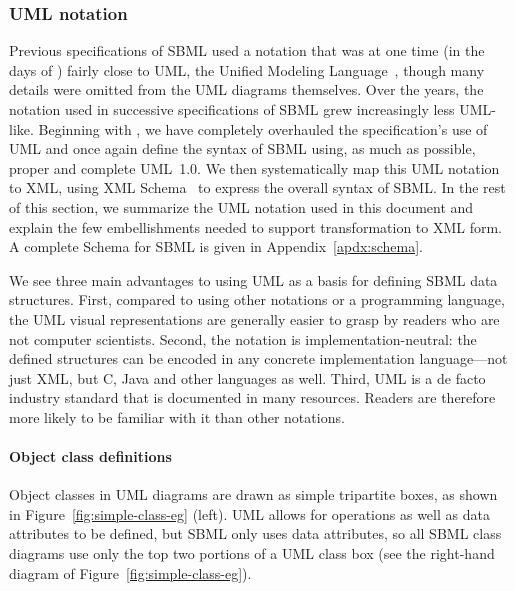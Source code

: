 \begin{blockChanged}

\subsubsection{UML notation}
\label{sec:notation-uml}


Previous specifications of SBML used a notation that was at one
time (in the days of \sbmlone) fairly close to UML, the Unified
Modeling Language~\citep{eriksson:1998,oestereich:1999}, though
many details were omitted from the UML diagrams themselves.  Over
the years, the notation used in successive specifications of SBML
grew increasingly less UML-like.  Beginning with \sbmltwothree, we
have completely overhauled the specification's use of UML and once
again define the syntax of SBML using, as much as possible, proper
and complete UML~1.0.  We then systematically map this UML
notation to XML, using XML
Schema~\citep{biron:2000,fallside:2000,thompson:2000} to express
the overall syntax of SBML.  In the rest of this section, we
summarize the UML notation used in this document and explain the
few embellishments needed to support transformation to XML form.
A complete Schema for SBML is given in Appendix~\ref{apdx:schema}.

We see three main advantages to using UML as a basis for defining
SBML data structures.  First, compared to using other notations or
a programming language, the UML visual representations are
generally easier to grasp by readers who are not computer
scientists.  Second, the notation is implementation-neutral: the
defined structures can be encoded in any concrete implementation
language---not just XML, but C, Java and other languages as well.
Third, UML is a de facto industry standard that is documented in
many resources.  Readers are therefore more likely to be familiar
with it than other notations.


\paragraph{Object class definitions}

Object classes in UML diagrams are drawn as simple tripartite
boxes, as shown in Figure~\ref{fig:simple-class-eg} (left).  UML
allows for operations as well as data attributes to be defined,
but SBML only uses data attributes, so all SBML class diagrams use
only the top two portions of a UML class box (see the right-hand
diagram of Figure~\ref{fig:simple-class-eg}).


\end{blockChanged}
